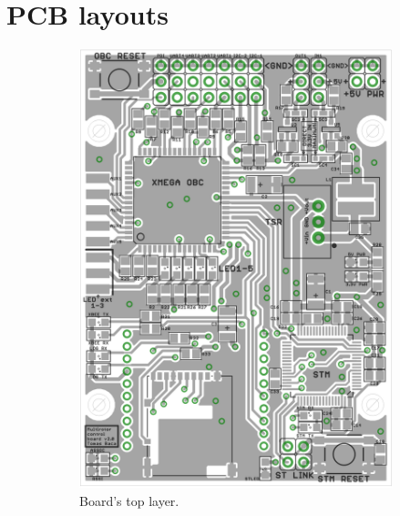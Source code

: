 \section{PCB layouts}\label{ape:pcb}
\begin{figure}[H]
\centering
\begin{subfigure}[b]{0.5\textwidth}
	\includegraphics[width=\textwidth]{fig/layout_top.png}
	\caption{Board's top layer.}
	\label{fig:layout_top}
\end{subfigure}%
\begin{subfigure}[b]{0.5\textwidth}

\end{subfigure}
\end{figure}
